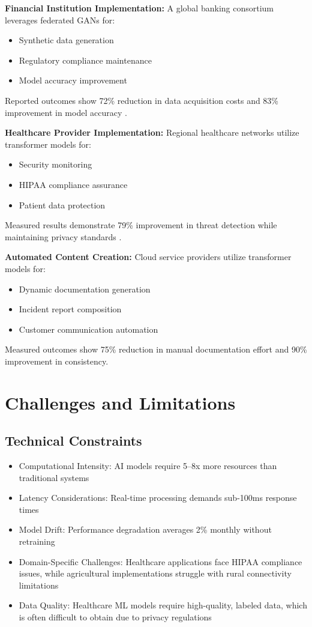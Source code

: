 \documentclass[a4paper,12pt]{article}
\begin{document}
\textbf{Financial Institution Implementation:} A global banking consortium leverages federated GANs for:
\begin{itemize}
    \item Synthetic data generation
    \item Regulatory compliance maintenance
    \item Model accuracy improvement
\end{itemize}
Reported outcomes show 72\% reduction in data acquisition costs and 83\% improvement in model accuracy \citet{mothukuri2021a}.

\textbf{Healthcare Provider Implementation:} Regional healthcare networks utilize transformer models for:
\begin{itemize}
    \item Security monitoring
    \item HIPAA compliance assurance
    \item Patient data protection
\end{itemize}
Measured results demonstrate 79\% improvement in threat detection while maintaining privacy standards \citet{hossain2020}.

\textbf{Automated Content Creation:} Cloud service providers utilize transformer models for:
\begin{itemize}
    \item Dynamic documentation generation
    \item Incident report composition
    \item Customer communication automation
\end{itemize}
Measured outcomes show 75\% reduction in manual documentation effort and 90\% improvement in consistency.

\section{Challenges and Limitations}
\subsection{Technical Constraints}
\begin{itemize}
    \item Computational Intensity: AI models require 5--8x more resources than traditional systems
    \item Latency Considerations: Real-time processing demands sub-100ms response times
    \item Model Drift: Performance degradation averages 2\% monthly without retraining
    \item Domain-Specific Challenges: Healthcare applications face HIPAA compliance issues, while agricultural implementations struggle with rural connectivity limitations
    \item Data Quality: Healthcare ML models require high-quality, labeled data, which is often difficult to obtain due to privacy regulations
\end{itemize}
\end{document}
